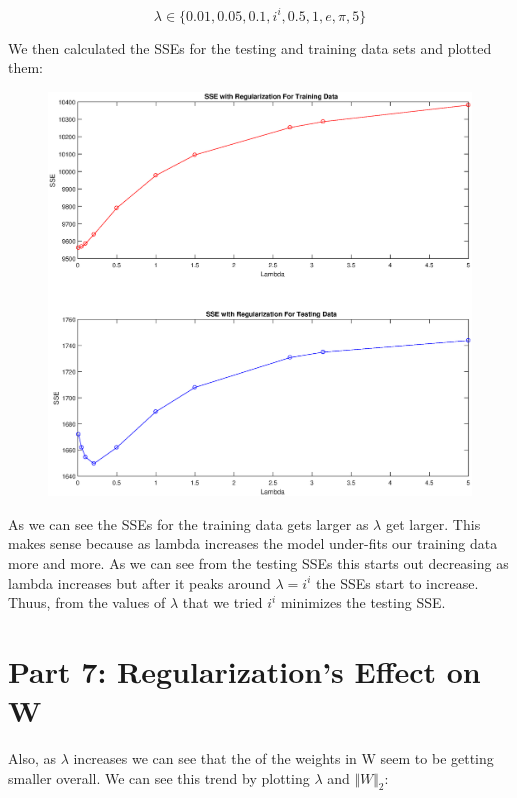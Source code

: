 \documentclass{article}
\begin{document}
$$
\lambda \in \{ 0.01, 0.05, 0.1, i^{i}, 0.5, 1, e, \pi, 5 \}
$$
	
We then calculated the SSEs for the testing and training data sets and plotted them:
	
	\begin{figure}[h!]
		\begin{center} 
			\includegraphics[scale=0.5]{lambda_figure.eps} 
		\end{center}  
		\label{fig:M2}
	\end{figure}

As we can see the SSEs for the training data gets larger as $\lambda$ get larger. This makes sense because as lambda increases the model under-fits our training data more and more. As we can see from the testing SSEs this starts out decreasing as lambda increases but after it peaks around $\lambda = i^{i}$ the SSEs start to increase. Thuus, from the values of $\lambda$ that we tried $i^i$ minimizes the testing SSE. \\ 

\section*{Part 7: Regularization's Effect on W}

Also, as $\lambda$ increases we can see that the of the weights in W seem to be getting smaller overall. We can see this trend by plotting $\lambda$ and $\Vert W \Vert_{2}$:
\end{document}
